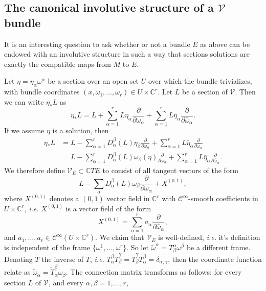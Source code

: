 \documentclass[11pt]{amsart}
\newcommand{\C}{\mathbb{C}}
\newcommand{\dop}[1]{\frac{\partial}{\partial #1}}
\theoremstyle{definition}
\theoremstyle{remark}
\theoremstyle{plain}
\begin{document}
\subsection{The canonical involutive structure of a $\mathcal{V}$ bundle} %
\label{sub:the_canonical_cr_structure_of_a_cr_bundle}
%
%

It is an interesting question to ask whether or not a bundle $E$ as above
can be endowed with an involutive structure in such a way that sections solutions
are exactly the compatible maps from $M$ to $E$. 

Let $\eta = \eta_\alpha \omega^\alpha$ be a section over an open set $U$ over
which the bundle trivializes, with bundle coordinates $(x,\omega_1, \dots, \omega_r) \in U \times \C^r$. Let $L$ be a section of $\mathcal{V}$. Then we can write $\eta_\ast L$ as
%
\begin{equation*}
	\eta_\ast L = L + \sum_{\alpha=1}^r L\eta_\alpha \frac{\partial}{\partial \omega_\alpha} + \sum_{\alpha=1}^r L \bar{\eta}_\alpha\frac{\partial}{\partial \bar{\omega}_\alpha}.
\end{equation*}
%
If we assume $\eta$ is a solution, then 
%
\begin{align*}
	\eta_\ast L & = L  - \sum_{\alpha=1}^r D_\alpha^\beta(L)\eta_\beta \frac{\partial}{\partial \omega_\alpha} + \sum_{\alpha=1}^r L \bar{\eta}_\alpha\frac{\partial}{\partial \bar{\omega}_\alpha}\\
	& =  L  - \sum_{\alpha=1}^r D_\alpha^\beta(L)\omega_\beta(\eta) \frac{\partial}{\partial \omega_\alpha} + \sum_{\alpha=1}^r L \bar{\eta}_\alpha\frac{\partial}{\partial \bar{\omega}_\alpha}.
\end{align*}
%
We therefore define $\mathcal{V}_E \subset \mathbb{C} TE$ to consist of all tangent vectors of the form
%
\begin{equation}\label{eq:defn_V_E}
	 L - \sum_{\alpha} D^\beta_{\alpha} ( L) \omega_\beta \dop{\omega_\alpha} + X^{(0,1)}, 
\end{equation}
%
where $X^{(0,1)}$ denotes a $(0,1)$ vector field in $\mathbb{C}^r$ with $\mathcal{C}^\infty$-smooth coefficients in $U\times\mathbb{C}^r$, \textit{i.e.} $X^{(0,1)}$ is a vector field of the form
%
\[X^{(0,1)} = \sum_{\alpha=1}^r a_\alpha \frac{\partial}{\partial \bar{\omega}_\alpha},\]
%
and $a_1,\dots,a_r \in \mathcal{C}^\infty(U\times\mathbb{C}^r)$. We claim that $\mathcal{V}_E$ is well-defined, \textit{i.e.} it's definition is independent of the frame $\{\omega^1 ,\dots, \omega^r \}$. So let $\tilde \omega^\alpha = T^\alpha_\beta \omega^\beta$ be a different frame. Denoting $\tilde{T}$ the inverse of $T$, \textit{i.e.} $T_\alpha^\beta \tilde{T}_\beta^\gamma = \tilde{T}_\beta^\gamma  T_\alpha^\beta = \delta_{\alpha,\gamma}$, then the coordinate function relate as ${\tilde \omega}_\alpha = {\tilde T}_\alpha^\beta \omega_\beta $. The connection matrix transforms as follows: for every section $L$ of $\mathcal{V}$, and every $\alpha,\beta =1, \dots, r$, 
\end{document}

